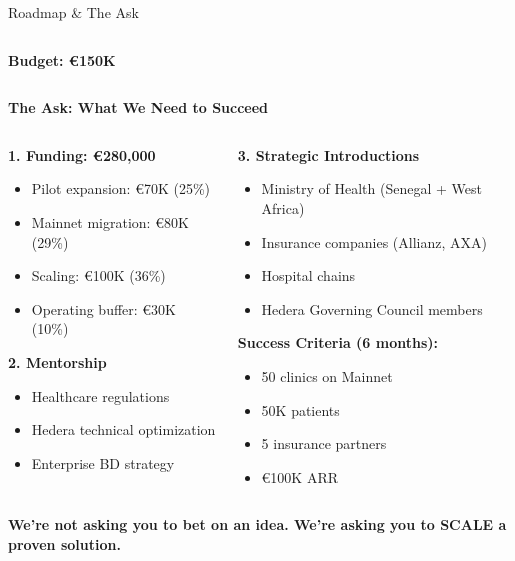 \documentclass[aspectratio=169,xcolor=dvipsnames,20pt]{beamer}
\newcommand{\checkitem}{\item[\color{SuccessGreen}\faCheckCircle]}
\begin{document}
\begin{frame}{Roadmap \& The Ask}
\begin{columns}[T]
\begin{column}{0.33\textwidth}
      \textbf{Budget: €150K}
    \end{column}
  \end{columns}

  \vspace{0.5cm}

  \textbf{\textcolor{HederaPurple}{The Ask: What We Need to Succeed}}

  \begin{columns}[T]
    \begin{column}{0.5\textwidth}
      \textbf{1. Funding: €280,000}
      \begin{itemize}
        \item Pilot expansion: €70K (25\%)
        \item Mainnet migration: €80K (29\%)
        \item Scaling: €100K (36\%)
        \item Operating buffer: €30K (10\%)
      \end{itemize}

      \vspace{0.2cm}

      \textbf{2. Mentorship}
      \begin{itemize}
        \item Healthcare regulations
        \item Hedera technical optimization
        \item Enterprise BD strategy
      \end{itemize}
    \end{column}

    \begin{column}{0.5\textwidth}
      \textbf{3. Strategic Introductions}
      \begin{itemize}
        \item Ministry of Health (Senegal + West Africa)
        \item Insurance companies (Allianz, AXA)
        \item Hospital chains
        \item Hedera Governing Council members
      \end{itemize}

      \vspace{0.2cm}

      \textbf{Success Criteria (6 months):}
      \begin{itemize}
        \checkitem 50 clinics on Mainnet
        \checkitem 50K patients
        \checkitem 5 insurance partners
        \checkitem €100K ARR
      \end{itemize}
    \end{column}
  \end{columns}

  \vspace{0.3cm}

  \begin{center}
    \Large{\textbf{We're not asking you to bet on an idea. We're asking you to SCALE a proven solution.}}
  \end{center}

\end{frame}
\end{document}
